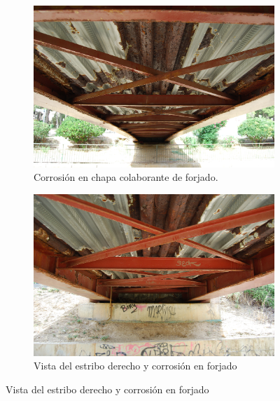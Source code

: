\documentclass[a4paper,11pt ]{xc_webpage_project}
\renewcommand{\widhtLeftCol}{0.50\textwidth} %
\renewcommand{\widhtRightCol}{0.45\textwidth} %
\begin{document}
\begin{figure}[h]
  \begin{subfigure}[l]{\widhtLeftCol}
  \centering
  \includegraphics[width=\textwidth]{figures/corrosion_fisura_transversal_zona_estribo_derecho}
  \caption{Corrosión en chapa colaborante de forjado.}
  \end{subfigure}
\hfill
  \begin{subfigure}[r]{\widhtRightCol}
  \centering
  \includegraphics[width=\textwidth]{figures/corrosion_forjado_zona_central_y_laterales}
  \caption{Vista del estribo derecho y corrosión en forjado}
  \end{subfigure}
  \end{figure}


\end{document}
